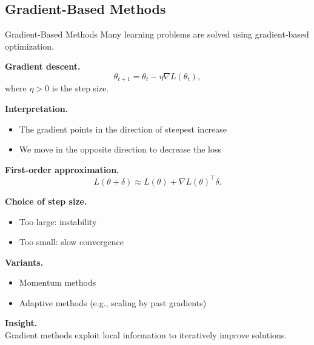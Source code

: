 \documentclass[aspectratio=169,11pt]{beamer}
\begin{document}
\subsection{Gradient-Based Methods}
\begin{frame}[t,allowframebreaks]{Gradient-Based Methods}
\small
Many learning problems are solved using gradient-based optimization.

\textbf{Gradient descent.}\\ \[
\theta_{t+1} = \theta_t - \eta \nabla L(\theta_t),
\]
where $\eta > 0$ is the step size.

\textbf{Interpretation.}\\ \begin{itemize}
    \item The gradient points in the direction of steepest increase
    \item We move in the opposite direction to decrease the loss
\end{itemize}

\textbf{First-order approximation.}\\ \[
L(\theta + \delta) \approx L(\theta) + \nabla L(\theta)^\top \delta.
\]

\textbf{Choice of step size.}\\ \begin{itemize}
    \item Too large: instability
    \item Too small: slow convergence
\end{itemize}

\textbf{Variants.}\\ \begin{itemize}
    \item Momentum methods
    \item Adaptive methods (e.g., scaling by past gradients)
\end{itemize}

\textbf{Insight.}\\ Gradient methods exploit local information to iteratively improve solutions.
\end{frame}
\end{document}
